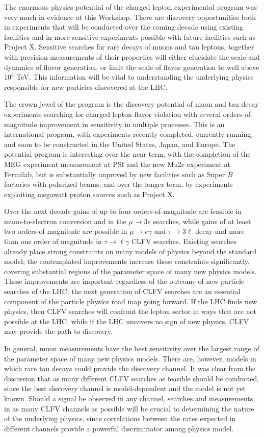 The enormous physics potential of the charged
lepton experimental program was very much in evidence at this Workshop. There are discovery opportunities both in experiments that will be conducted over the coming decade using existing facilities and in more sensitive experiments possible with future facilities such as Project X.
Sensitive searches for rare decays of muons and tau leptons, together with precision measurements of their properties will either elucidate the scale and dynamics of flavor generation, or
limit the scale of flavor generation to well above $10^4$ TeV.  This information
will be vital to understanding the underlying physics responsible for new particles discovered at the LHC.

The crown jewel of the program is the discovery potential of muon and tau decay experiments searching for charged lepton flavor violation with several orders-of-magnitude improvement in sensitivity in
multiple processes.  This is an
international program, with experiments recently completed, currently running, and
soon to be constructed in the United States, Japan, and Europe.  The potential program is interesting over the near term, with the completion of the MEG experiment measurement at PSI and the new Mu2e experiment at Fermilab, but is substantially improved by new facilities such as Super $B$ factories with polarized beams, and over the longer term, by experiments exploiting megawatt proton sources such as Project X.

Over the next decade
gains of up to four orders-of-magnitude are feasible in
muon-to-electron conversion and in the $\mu \to 3 e$
searches, while gains of at least two orders-of-magnitude
are possible in $\mu \to e\gamma$ and $\tau \to 3\ell$ decay and more than one order of magnitude in $\tau \to \ell\gamma$ CLFV
searches.  Existing searches already place strong constraints on
many models of physics beyond the standard model; the contemplated improvements increase these constraints significantly, covering substantial regions of the parameter space of many new physics models.
These improvements are important regardless of the outcome of new particle searches of the
LHC; the next generation of CLFV searches are an essential
component of the particle physics road map going forward.  If the LHC finds new
physics, then CLFV searches will confront the lepton sector in ways
that are not possible at the LHC, while if the LHC uncovers no sign of
new physics, CLFV may provide the path to discovery.

In general, muon measurements have the best
sensitivity over the largest range of the parameter space of many new
physics models. There are, however, models
in which  rare tau decays could provide the discovery
channel. It was clear from the discussion that as many different
CLFV searches as feasible should be conducted, since the best discovery
channel is model-dependent and the model is not yet known.  Should a
signal be observed in any channel, searches and measurements in as
many CLFV channels as possible will be crucial to determining the nature
of the underlying physics, since correlations between the rates
expected in different channels provide a powerful discriminator among
physics model.

